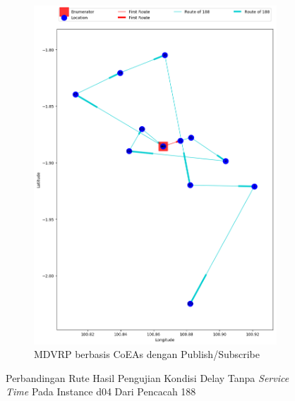 \begin{figure}[H]\ContinuedFloat
	\centering
	\begin{subfigure}[t]{\textwidth}
		\centering
		\includegraphics[width=\textwidth]{Resources/Images/delayed_4/real_m15_n100_delayed_4_188_pubsub_coes}
		\caption{MDVRP berbasis CoEAs dengan Publish/Subscribe}
		\label{fig:real_m15_n100_delayed_4_188_pubsub_coes}
	\end{subfigure}
	\caption{Perbandingan Rute Hasil Pengujian Kondisi Delay Tanpa \textit{Service Time} Pada Instance d04 Dari Pencacah 188}
	\label{fig:real_m15_n100_delayed_4_188_contd}
\end{figure}


